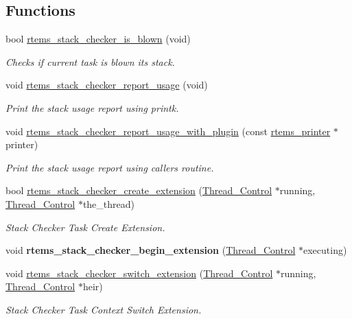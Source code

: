 \subsection*{Functions}
\begin{DoxyCompactItemize}
\item 
bool \mbox{\hyperlink{group__libmisc__stackchk_ga3d14a039e776b11639d8b0a4166756e6}{rtems\+\_\+stack\+\_\+checker\+\_\+is\+\_\+blown}} (void)
\begin{DoxyCompactList}\small\item\em Checks if current task is blown its stack. \end{DoxyCompactList}\item 
void \mbox{\hyperlink{group__libmisc__stackchk_ga8df4c8fbe9071233068782c83dc83fd0}{rtems\+\_\+stack\+\_\+checker\+\_\+report\+\_\+usage}} (void)
\begin{DoxyCompactList}\small\item\em Print the stack usage report using printk. \end{DoxyCompactList}\item 
void \mbox{\hyperlink{group__libmisc__stackchk_ga25ea63d8178d6eb26d2a1148bb03117d}{rtems\+\_\+stack\+\_\+checker\+\_\+report\+\_\+usage\+\_\+with\+\_\+plugin}} (const \mbox{\hyperlink{structrtems__printer}{rtems\+\_\+printer}} $\ast$printer)
\begin{DoxyCompactList}\small\item\em Print the stack usage report using caller\textquotesingle{}s routine. \end{DoxyCompactList}\item 
bool \mbox{\hyperlink{group__libmisc__stackchk_ga024648492aa565244588c42a90955d3d}{rtems\+\_\+stack\+\_\+checker\+\_\+create\+\_\+extension}} (\mbox{\hyperlink{struct__Thread__Control}{Thread\+\_\+\+Control}} $\ast$running, \mbox{\hyperlink{struct__Thread__Control}{Thread\+\_\+\+Control}} $\ast$the\+\_\+thread)
\begin{DoxyCompactList}\small\item\em Stack Checker Task Create Extension. \end{DoxyCompactList}\item 
\mbox{\label{group__libmisc__stackchk_ga2ab96674e9e2f3ae35b8d165b548aa61}} 
void {\bfseries rtems\+\_\+stack\+\_\+checker\+\_\+begin\+\_\+extension} (\mbox{\hyperlink{struct__Thread__Control}{Thread\+\_\+\+Control}} $\ast$executing)
\item 
void \mbox{\hyperlink{group__libmisc__stackchk_gaab6fe708fb2c9109528ce4c55c92e9f2}{rtems\+\_\+stack\+\_\+checker\+\_\+switch\+\_\+extension}} (\mbox{\hyperlink{struct__Thread__Control}{Thread\+\_\+\+Control}} $\ast$running, \mbox{\hyperlink{struct__Thread__Control}{Thread\+\_\+\+Control}} $\ast$heir)
\begin{DoxyCompactList}\small\item\em Stack Checker Task Context Switch Extension. \end{DoxyCompactList}\end{DoxyCompactItemize}


